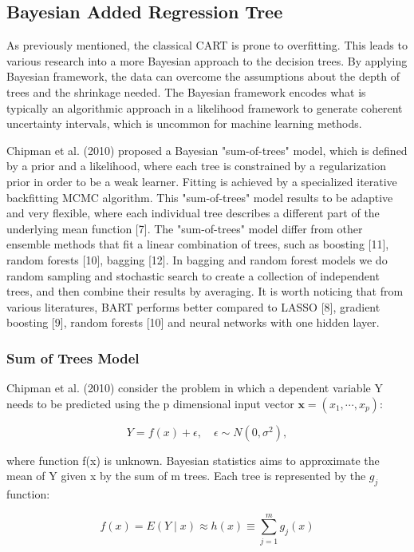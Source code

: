 \documentclass{usiinftr}
\begin{document}
\subsection{Bayesian Added Regression Tree}
As previously mentioned, the classical CART is prone to overfitting. This leads to various research into a more Bayesian approach to the decision trees. By applying Bayesian framework, the data can overcome the assumptions about the depth of trees and the shrinkage needed. The Bayesian framework encodes what is typically an algorithmic approach in a likelihood framework to generate coherent uncertainty intervals, which is uncommon for machine learning methods. 

 Chipman et al. (2010) proposed a Bayesian "sum-of-trees" model, which is defined by a prior and a likelihood, where each tree is constrained by a regularization prior in order to be a weak learner.  Fitting is achieved by a specialized iterative backfitting MCMC algorithm. This "sum-of-trees" model results to be adaptive and very flexible, where each individual tree describes a different part of the underlying mean function [7]. The "sum-of-trees" model differ from other ensemble methods that fit a linear combination of trees, such as boosting [11], random forests [10], bagging [12]. In bagging and random forest models we do random sampling and stochastic search to create a collection of independent trees, and then combine their results by averaging. It is worth noticing that from various literatures, BART performs better compared to LASSO [8], gradient boosting [9], random forests [10] and neural networks with one hidden layer. 
 
\subsubsection{Sum of Trees Model}
Chipman et al. (2010) consider the problem in which a dependent variable Y needs to be predicted using the p dimensional input vector $\textbf{x} = (x_1,\cdots, x_p)$:

\begin{equation}
Y=f(x)+\epsilon, \quad \epsilon \sim N\left(0, \sigma^{2}\right),
\end{equation}

where function f(x) is unknown. Bayesian statistics aims to approximate the mean of Y given x by the sum of m trees. Each tree is represented by the $g_j$ function:

\begin{equation} \label{sum}
f(x)=E(Y \mid x) \approx h(x) \equiv \sum_{j=1}^{m} g_{j}(x)
\end{equation}
\end{document}
